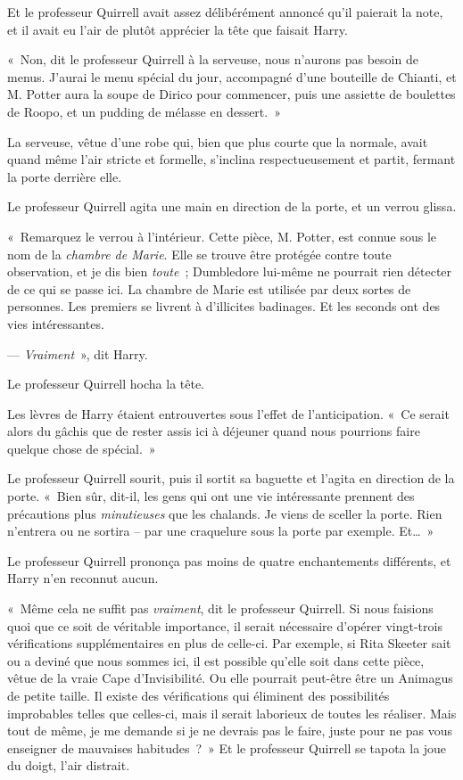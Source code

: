 Et le professeur Quirrell avait assez délibérément annoncé qu'il paierait la note, et il avait eu l'air de plutôt apprécier la tête que faisait Harry.

«~Non, dit le professeur Quirrell à la serveuse, nous n'aurons pas besoin de menus.
J'aurai le menu spécial du jour, accompagné d'une bouteille de Chianti, et M. Potter aura la soupe de Dirico pour commencer, puis une assiette de boulettes de Roopo, et un pudding de mélasse en dessert.~»

La serveuse, vêtue d’une robe qui, bien que plus courte que la normale, avait quand même l'air stricte et formelle, s'inclina respectueusement et partit, fermant la porte derrière elle.

Le professeur Quirrell agita une main en direction de la porte, et un verrou glissa.

«~Remarquez le verrou à l'intérieur.
Cette pièce, M. Potter, est connue sous le nom de la \emph{chambre de Marie}.
Elle se trouve être protégée contre toute observation, et je dis bien \emph{toute}~; Dumbledore lui-même ne pourrait rien détecter de ce qui se passe ici.
La chambre de Marie est utilisée par deux sortes de personnes.
Les premiers se livrent à d'illicites badinages.
Et les seconds ont des vies intéressantes.

--- \emph{Vraiment}~», dit Harry.

Le professeur Quirrell hocha la tête.

Les lèvres de Harry étaient entrouvertes sous l'effet de l'anticipation.
«~Ce serait alors du gâchis que de rester assis ici à déjeuner quand nous pourrions faire quelque chose de spécial.~»

Le professeur Quirrell sourit, puis il sortit sa baguette et l'agita en direction de la porte.
«~Bien sûr, dit-il, les gens qui ont une vie intéressante prennent des précautions plus \emph{minutieuses} que les chalands.
Je viens de sceller la porte.
Rien n'entrera ou ne sortira -- par une craquelure sous la porte par exemple.
Et…~»

Le professeur Quirrell prononça pas moins de quatre enchantements différents, et Harry n'en reconnut aucun.

«~Même cela ne suffit pas \emph{vraiment}, dit le professeur Quirrell.
Si nous faisions quoi que ce soit de véritable importance, il serait nécessaire d'opérer vingt-trois vérifications supplémentaires en plus de celle-ci.
Par exemple, si Rita Skeeter sait ou a deviné que nous sommes ici, il est possible qu'elle soit dans cette pièce, vêtue de la vraie Cape d'Invisibilité.
Ou elle pourrait peut-être être un Animagus de petite taille.
Il existe des vérifications qui éliminent des possibilités improbables telles que celles-ci, mais il serait laborieux de toutes les réaliser.
Mais tout de même, je me demande si je ne devrais pas le faire, juste pour ne pas vous enseigner de mauvaises habitudes~?~»
Et le professeur Quirrell se tapota la joue du doigt, l'air distrait.

